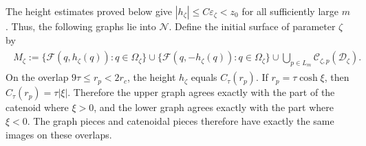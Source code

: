 \documentclass[a4paper,11pt,oneside,reqno]{amsart}
\numberwithin{equation}{section}
\theoremstyle{definition}
\begin{document}
The height estimates proved below give
$|h_\zeta|\leq C\varepsilon_\zeta<z_0$ for all
sufficiently large $m$. Thus, the following graphs lie into $\mathcal N$. Define the initial surface of parameter $\zeta$ by
%
\begin{align}
    \label{eq:s4-initial-double}
    \begin{split}
        M_\zeta:=
        \{\mathcal F(q,h_\zeta(q)):q\in\Omega_\zeta\}
        \cup
        \{\mathcal F(q,-h_\zeta(q)):q\in\Omega_\zeta\}\cup
        \bigcup_{p\in L_m}
        \mathcal C_{\zeta,p}(\mathcal D_\zeta).
    \end{split}
\end{align}
%
On the overlap $9\tau\leq r_p<2r_c$, the height
$h_\zeta$ equals $C_\tau(r_p)$. If
$r_p=\tau\cosh\xi$, then
$C_\tau(r_p)=\tau|\xi|$. Therefore the upper graph agrees
exactly with the part of the catenoid where $\xi>0$,
and the lower graph agrees exactly with the part where
$\xi<0$. The graph pieces and catenoidal pieces
therefore have exactly the same images on these overlaps.

\end{document}
